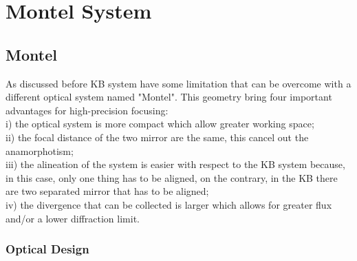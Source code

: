 \chapter{Montel System}
\label{capitolo3}
\thispagestyle{empty}

\vspace{0.5cm}

\section{Montel}

\hspace{10mm} As discussed before KB system have some limitation that can be overcome with a different optical system named "Montel". This geometry bring four important advantages for high-precision focusing: 
\\ i) the optical system is more compact which allow greater working space;
\\ ii) the focal distance of the two mirror are the same, this cancel out  the anamorphotism;
\\ iii) the alineation of the system is easier with respect to the KB system because, in this case, only one thing has to be aligned, on the contrary, in the KB there are two separated mirror that has to be aligned;
\\ iv) the divergence that can be collected is larger which allows for greater flux and/or a lower diffraction limit.

\subsection{Optical Design}

